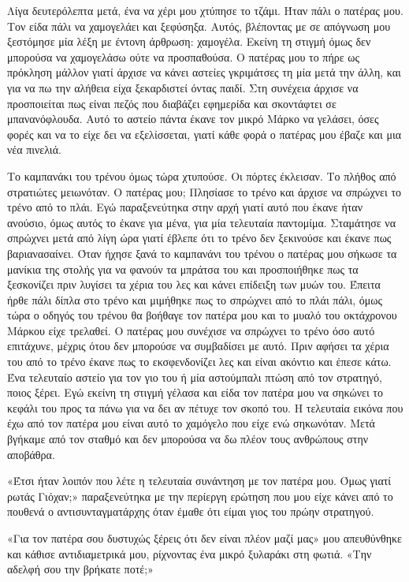 \documentclass[12pt,twoside, openany]{book}
\begin{document}
Λίγα δευτερόλεπτα μετά, ένα να χέρι μου χτύπησε το τζάμι. Ήταν πάλι ο πατέρας μου. Τον είδα πάλι να χαμογελάει και ξεφύσηξα. Αυτός, βλέποντας με σε απόγνωση μου ξεστόμησε  μία λέξη με έντονη άρθρωση: χαμογέλα. Εκείνη τη στιγμή όμως δεν μπορούσα να χαμογελάσω ούτε να προσπαθούσα. Ο πατέρας μου το πήρε ως πρόκληση μάλλον γιατί άρχισε να κάνει αστείες γκριμάτσες τη μία μετά την άλλη, και για να πω την αλήθεια είχα ξεκαρδιστεί όντας παιδί. Στη συνέχεια άρχισε να προσποιείται πως είναι πεζός που διαβάζει εφημερίδα και σκοντάφτει σε μπανανόφλουδα. Αυτό το αστείο πάντα έκανε τον μικρό Μάρκο να γελάσει, όσες φορές και να το είχε δει να εξελίσσεται, γιατί κάθε φορά ο πατέρας μου έβαζε και μια νέα πινελιά.

Το καμπανάκι του τρένου όμως τώρα χτυπούσε. Οι πόρτες έκλεισαν. Το πλήθος από στρατιώτες μειωνόταν. Ο πατέρας μου; Πλησίασε το τρένο και άρχισε να σπρώχνει το τρένο από το πλάι. Εγώ παραξενεύτηκα στην αρχή γιατί αυτό που έκανε ήταν ανούσιο, όμως αυτός το έκανε για μένα, για μία τελευταία παντομίμα. Σταμάτησε να σπρώχνει μετά από λίγη ώρα γιατί έβλεπε ότι το τρένο δεν ξεκινούσε και έκανε πως βαριανασαίνει. Όταν ήχησε ξανά το καμπανάνι του τρένου ο πατέρας μου σήκωσε τα μανίκια της στολής για να φανούν τα μπράτσα του και προσποιήθηκε πως τα ξεσκονίζει πριν λυγίσει τα χέρια του λες και κάνει επίδειξη των μυών του. Έπειτα ήρθε πάλι δίπλα στο τρένο και μιμήθηκε πως το σπρώχνει από το πλάι πάλι, όμως τώρα ο οδηγός του τρένου θα βοήθαγε τον πατέρα μου και το μυαλό του οκτάχρονου Μάρκου είχε τρελαθεί. Ο πατέρας μου συνέχισε να σπρώχνει το τρένο όσο αυτό επιτάχυνε, μέχρις ότου δεν μπορούσε να συμβαδίσει με αυτό. Πριν αφήσει τα χέρια του από το τρένο έκανε πως το εκσφενδονίζει λες και είναι ακόντιο και έπεσε κάτω. Ένα τελευταίο αστείο για τον γιο του ή μία αστούμπαλι πτώση από τον στρατηγό, ποιος ξέρει. Εγώ εκείνη τη στιγμή γέλασα και είδα τον πατέρα μου να σηκώνει το κεφάλι του προς τα πάνω για να δει αν πέτυχε τον σκοπό του. Η τελευταία εικόνα που έχω από τον πατέρα μου είναι αυτό το χαμόγελο που είχε ενώ σηκωνόταν. Μετά βγήκαμε από τον σταθμό και δεν μπορούσα να δω πλέον τους ανθρώπους στην αποβάθρα. \newline\newline

«Έτσι ήταν λοιπόν που λέτε η τελευταία συνάντηση με τον πατέρα μου. Όμως γιατί ρωτάς Γιόχαν;» παραξενεύτηκα με την περίεργη ερώτηση που μου είχε κάνει από το πουθενά ο αντισυνταγματάρχης όταν έμαθε ότι είμαι γιος του πρώην στρατηγού.

«Για τον πατέρα σου δυστυχώς ξέρεις ότι δεν είναι πλέον μαζί μας» μου απευθύνθηκε και κάθισε αντιδιαμετρικά μου, ρίχνοντας ένα μικρό ξυλαράκι στη φωτιά. «Την αδελφή σου την βρήκατε ποτέ;»
\end{document}
